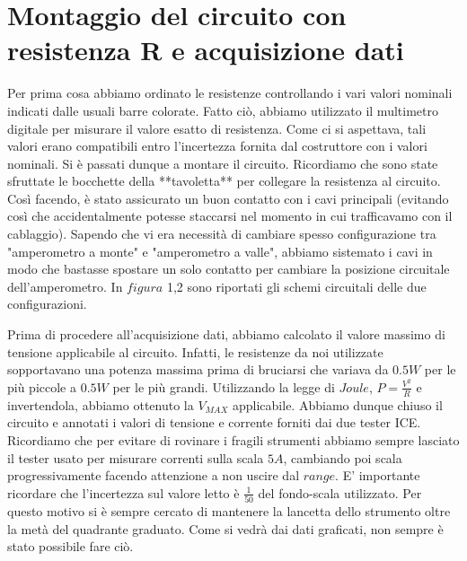 \section{Montaggio del circuito con resistenza R e acquisizione dati}
Per prima cosa abbiamo ordinato le resistenze controllando i vari valori nominali indicati dalle usuali barre colorate.
Fatto ciò, abbiamo utilizzato il multimetro digitale per misurare il valore esatto di resistenza. Come ci si aspettava, tali valori erano compatibili entro l'incertezza fornita dal costruttore con i valori nominali.
Si è passati dunque a montare il circuito. Ricordiamo che sono state sfruttate le bocchette della **tavoletta** per collegare la resistenza al circuito. Così facendo, è stato assicurato un buon contatto con i cavi principali (evitando così che accidentalmente potesse staccarsi nel momento in cui trafficavamo con il cablaggio).
Sapendo che vi era necessità di cambiare spesso configurazione tra "amperometro a monte" e "amperometro a valle", abbiamo sistemato i cavi in modo che bastasse spostare un solo contatto per cambiare la posizione circuitale dell'amperometro. In $figura$ 1,2 sono riportati gli schemi circuitali delle due configurazioni.


Prima di procedere all'acquisizione dati, abbiamo calcolato il valore massimo di tensione applicabile al circuito. Infatti, le resistenze da noi utilizzate sopportavano una potenza massima prima di bruciarsi che variava da $0.5W$ per le più piccole a $0.5W$ per le più grandi. Utilizzando la legge di $Joule$, $P=\frac{V^2}{R}$ e invertendola, abbiamo ottenuto la $V_{MAX}$ applicabile.
Abbiamo dunque chiuso il circuito e annotati i valori di tensione e corrente forniti dai due tester ICE. Ricordiamo che per evitare di rovinare i fragili strumenti abbiamo sempre lasciato il tester usato per misurare correnti sulla scala $5A$, cambiando poi scala progressivamente facendo attenzione a non uscire dal $range$. E' importante ricordare che l'incertezza sul valore letto è $\frac{1}{50}$ del fondo-scala utilizzato. Per questo motivo si è sempre cercato di mantenere la lancetta dello strumento oltre la metà del quadrante graduato. Come si vedrà dai dati graficati, non sempre è stato possibile fare ciò.